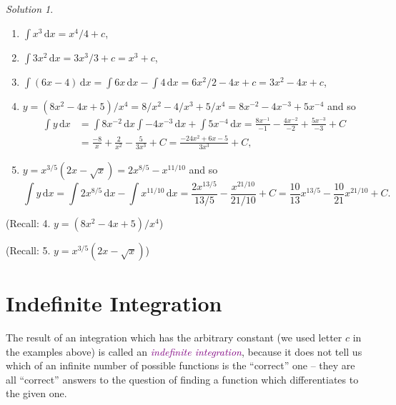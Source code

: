 \documentclass[
  english,
  11pt,
  oneside]{book}
\providecommand{\tightlist}{%
  \setlength{\itemsep}{0pt}\setlength{\parskip}{0pt}}
\newcommand{\slide}{}
\theoremstyle{definition}
\theoremstyle{definition}
\theoremstyle{definition}
\theoremstyle{definition}
\theoremstyle{remark}
\newtheorem*{solution}{Solution}
\begin{document}
\begin{solution}
\leavevmode

\begin{enumerate}
\def\labelenumi{\arabic{enumi}.}
\tightlist
\item
  \(\displaystyle\int x^3 \,\mathrm{d}x = x^4/4+c\),
\item
  \(\displaystyle\int 3x^2 \,\mathrm{d}x = 3x^3/3+c = x^3+c\),
\item
  \(\displaystyle\int(6x-4)\,\mathrm{d}x = \displaystyle\int 6x \,\mathrm{d}x - \displaystyle\int 4\,\mathrm{d}x = 6x^2/2-4x+c = 3x^2-4x+c\),
\item
  \(y=(8x^2-4x+5)/x^4 = 8/x^2-4/x^3+5/x^4 = 8x^{-2}-4x^{-3}+5x^{-4}\) and so
  \begin{align*}
  \int y \,\mathrm{d}x& = \int 8x^{-2}\,\mathrm{d}x\int -4x^{-3}\,\mathrm{d}x+\int5x^{-4}\,\mathrm{d}x = \frac{8x^{-1}}{-1}-\frac{4x^{-2}}{-2}+\frac{5x^{-3}}{-3}+C\\
  &=\frac{-8}{x}+\frac{2}{x^2}-\frac{5}{3x^3} + C
  = \frac{-24x^2+6x-5}{3x^3} + C,
  \end{align*}
\item
  \(y = x^{3/5}(2x-\sqrt{x}) = 2x^{8/5}-x^{11/10}\) and so
  \[
  \int y \,\mathrm{d}x = \int 2x^{8/5}\,\mathrm{d}x-\int x^{11/10}\,\mathrm{d}x = \frac{2x^{13/5}}{13/5} - \frac{x^{21/10}}{21/10}+C = \frac{10}{13}x^{13/5}-\frac{10}{21}x^{21/10} + C.
  \]
\end{enumerate}

\end{solution}

\begin{slidesonly}

\slide

(Recall: 4. \(y=(8x^2-4x+5)/x^4\))

\slide

(Recall: 5. \(y=x^{3/5}(2x-\sqrt{x})\))
\slide

\end{slidesonly}

\section{Indefinite Integration}\label{indefinite-integration}

The result of an integration which has the arbitrary constant (we used letter \(c\) in the examples above) is called an \textcolor{purple}{\em indefinite integration}, because it does not tell us which of an infinite number of possible functions is the ``correct'' one -- they are all ``correct'' answers to the question
of finding a function which differentiates to the given one.
\end{document}
